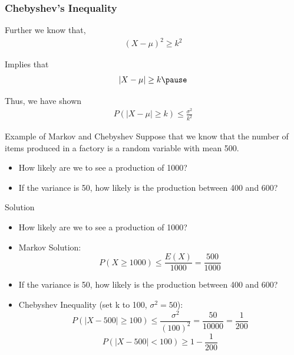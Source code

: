\documentclass{beamer}
\numberwithin{equation}{section}
\begin{document}
\begin{frame}
\frametitle{Chebyshev's Inequality} 


Further we know that, 
\begin{eqnarray}
(X - \mu)^2  \geq k^2 \nonumber 
\end{eqnarray}

\pause 

Implies that  \pause 
\begin{eqnarray}
|X - \mu| \geq k \nonumber  \pause 
\end{eqnarray}

Thus, we have shown  \pause 
\begin{eqnarray}
P( |X- \mu| \geq k) \leq \frac{\sigma^2}{k^2}\nonumber 
\end{eqnarray}

\end{frame}



\begin{frame}{Example of Markov and Chebyshev}
Suppose that we know that the number of items produced in a factory is a random variable with mean 500.
\begin{itemize}
\item How likely are we to see a production of 1000?
\item If the variance is 50, how likely is the production between 400 and 600?
\end{itemize}

\end{frame}

\begin{frame}{Solution}
\begin{itemize}
\item How likely are we to see a production of 1000?
\item Markov Solution:
$$P(X\geq 1000)\leq\frac{E(X)}{1000}=\frac{500}{1000}$$\pause
\item If the variance is 50, how likely is the production between 400 and 600?
\item Chebyshev Inequality (set k to 100, $\sigma^2=50$):
$$P(|X-500| \geq 100)\leq\frac{\sigma^2}{(100)^2}=\frac{50}{10000}=\frac{1}{200}$$
$$P(|X-500| < 100)\geq 1-\frac{1}{200}$$
\end{itemize}

\end{frame}
\end{document}
